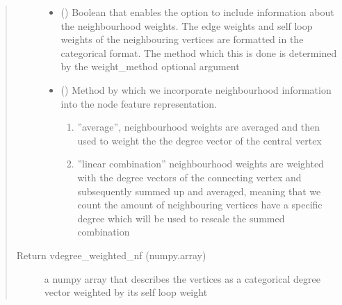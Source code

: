 \documentclass[letterpaper,10pt,english]{sphinxmanual}
\begin{document}
\begin{fulllineitems}
\begin{fulllineitems}
\begin{quote}
\begin{description}
\begin{itemize}
\item {} 
\sphinxstyleliteralstrong{\sphinxupquote{ (}}\sphinxstyleliteralstrong{\sphinxupquote{)}} (\sphinxstyleliteralemphasis{\sphinxupquote{(}}\sphinxstyleliteralemphasis{\sphinxupquote{)}}) \textendash{} Boolean that enables the option to include information about the neighbourhood
weights. The edge weights and self loop weights of the neighbouring vertices
are formatted in the categorical format. The method which this is done is
determined by the weight\_method optional argument

\item {} 
\sphinxstyleliteralstrong{\sphinxupquote{ (}}\sphinxstyleliteralstrong{\sphinxupquote{)}} (\sphinxstyleliteralemphasis{\sphinxupquote{(}}\sphinxstyleliteralemphasis{\sphinxupquote{)}}) \textendash{} 
Method by which we incorporate neighbourhood information into the node feature
representation.
\begin{enumerate}
%
\item {} 
”average”, neighbourhood weights are averaged and then used to weight the
the degree vector of the central vertex

\item {} 
”linear combination” neighbourhood weights are weighted with the degree vectors
of the connecting vertex and subsequently summed up and averaged, meaning that
we count the amount of neighbouring vertices have a specific degree which will be
used to rescale the summed combination

\end{enumerate}


\end{itemize}

\item[{Return vdegree\_weighted\_nf (numpy.array)}] \leavevmode
a numpy array that describes the vertices as a categorical degree vector weighted
by its self loop weight

\end{description}\end{quote}

\end{fulllineitems}



\end{fulllineitems}
\end{document}

